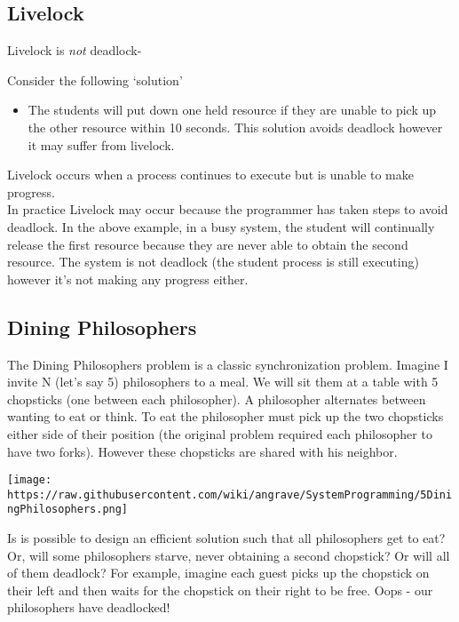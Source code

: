 \subsection{Livelock}\label{livelock}

Livelock is \emph{not} deadlock-

Consider the following `solution'

\begin{itemize}
\itemsep1pt\parskip0pt
\item
  The students will put down one held resource if they are unable to
  pick up the other resource within 10 seconds. This solution avoids
  deadlock however it may suffer from livelock.
\end{itemize}

Livelock occurs when a process continues to execute but is unable to
make progress.\\In practice Livelock may occur because the programmer
has taken steps to avoid deadlock. In the above example, in a busy
system, the student will continually release the first resource because
they are never able to obtain the second resource. The system is not
deadlock (the student process is still executing) however it's not
making any progress either.

\subsection{Dining Philosophers}\label{dining-philosophers}

The Dining Philosophers problem is a classic synchronization problem.
Imagine I invite N (let's say 5) philosophers to a meal. We will sit
them at a table with 5 chopsticks (one between each philosopher). A
philosopher alternates between wanting to eat or think. To eat the
philosopher must pick up the two chopsticks either side of their
position (the original problem required each philosopher to have two
forks). However these chopsticks are shared with his neighbor.

\texttt{[image: https://raw.githubusercontent.com/wiki/angrave/SystemProgramming/5DiningPhilosophers.png]}

Is is possible to design an efficient solution such that all
philosophers get to eat? Or, will some philosophers starve, never
obtaining a second chopstick? Or will all of them deadlock? For example,
imagine each guest picks up the chopstick on their left and then waits
for the chopstick on their right to be free. Oops - our philosophers
have deadlocked!
